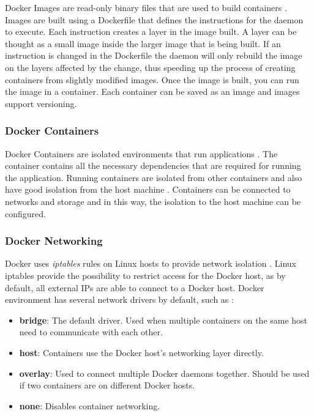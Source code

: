 \documentclass[fleqn,12pt]{olplainarticle}
\begin{document}
Docker Images are read-only binary files that are used to build containers \citep{docker:overview}. Images are built using a Dockerfile that defines the instructions for the daemon to execute. Each instruction creates a layer in the image built. A layer can be thought as a small image inside the larger image that is being built. If an instruction is changed in the Dockerfile the daemon will only rebuild the image on the layers affected by the change, thus speeding up the process of creating containers from slightly modified images. Once the image is built, you can run the image in a container. Each container can be saved as an image and images support versioning.

\subsubsection{Docker Containers}

Docker Containers are isolated environments that run applications \citep{aquasec:docker_architecture}. The container contains all the necessary dependencies that are required for running the application. Running containers are isolated from other containers and also have good isolation from the host machine \citep{docker:security}. Containers can be connected to networks and storage and in this way, the isolation to the host machine can be configured.

\subsubsection{Docker Networking}

Docker uses \textit{iptables} rules on Linux hosts to provide network isolation \citep{docker:iptables}. Linux iptables provide the possibility to restrict access for the Docker host, as by default, all external IPs are able to connect to a Docker host. Docker environment has several network drivers by default, such as \citep{docker:network}:

\begin{itemize}
    \item \textbf{bridge}: The default driver. Used when multiple containers on the same host need to communicate with each other.
    \item \textbf{host}: Containers use the Docker host's networking layer directly.
    \item \textbf{overlay}: Used to connect multiple Docker daemons together. Should be used if two containers are on different Docker hosts.
    \item \textbf{none}: Disables container networking.  
\end{itemize}
\end{document}
